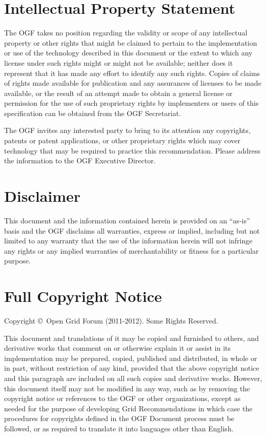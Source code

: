 \documentclass[10pt]{article}
\newcommand{\copyrightyears}{2011-2012}
\begin{document}

\section{Intellectual Property Statement}

The OGF takes no position regarding the validity or scope of any intellectual property or other rights that might be claimed to pertain to the implementation or use of the technology described in this document or the extent to which any license under such rights might or might not be available; neither does it represent that it has made any effort to identify any such rights.  Copies of claims of rights made available for publication and any assurances of licenses to be made available, or the result of an attempt made to obtain a general license or permission for the use of such proprietary rights by implementers or users of this specification can be obtained from the OGF Secretariat.

The OGF invites any interested party to bring to its attention any copyrights, patents or patent applications, or other proprietary rights which may cover technology that may be required to practice this recommendation.  Please address the information to the OGF Executive Director.

\section{Disclaimer}

This document and the information contained herein is provided on an \enquote{as-is} basis and the OGF disclaims all warranties, express or implied, including but not limited to any warranty that the use of the information herein will not infringe any rights or any implied warranties of merchantability or fitness for a particular purpose.

\section{Full Copyright Notice}

Copyright \copyright \ Open Grid Forum (\copyrightyears). Some Rights Reserved.

This document and translations of it may be copied and furnished to others, and derivative works that comment on or otherwise explain it or assist in its implementation may be prepared, copied, published and distributed, in whole or in part, without restriction of any kind, provided that the above copyright notice and this paragraph are included on all such copies and derivative works. However, this document itself may not be modified in any way, such as by removing the copyright notice or references to the OGF or other organizations, except as needed for the purpose of developing Grid Recommendations in which case the procedures for copyrights defined in the OGF Document process must be followed, or as required to translate it into languages other than English.
\end{document}
